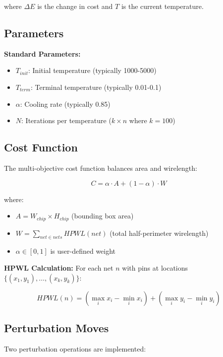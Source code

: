 \documentclass[11pt]{article}
\begin{document}
where $\Delta E$ is the change in cost and $T$ is the current temperature.

\subsection{Parameters}

\textbf{Standard Parameters:}
\begin{itemize}
    \item $T_{init}$: Initial temperature (typically 1000-5000)
    \item $T_{term}$: Terminal temperature (typically 0.01-0.1)
    \item $\alpha$: Cooling rate (typically 0.85)
    \item $N$: Iterations per temperature ($k \times n$ where $k=100$)
\end{itemize}

\subsection{Cost Function}

The multi-objective cost function balances area and wirelength:

\begin{equation}
C = \alpha \cdot A + (1-\alpha) \cdot W
\end{equation}

where:
\begin{itemize}
    \item $A = W_{chip} \times H_{chip}$ (bounding box area)
    \item $W = \sum_{net \in nets} HPWL(net)$ (total half-perimeter wirelength)
    \item $\alpha \in [0,1]$ is user-defined weight
\end{itemize}

\textbf{HPWL Calculation:} For each net $n$ with pins at locations $\{(x_1, y_1), \ldots, (x_k, y_k)\}$:

\begin{equation}
HPWL(n) = (\max_i x_i - \min_i x_i) + (\max_i y_i - \min_i y_i)
\end{equation}

\subsection{Perturbation Moves}

Two perturbation operations are implemented:
\end{document}
